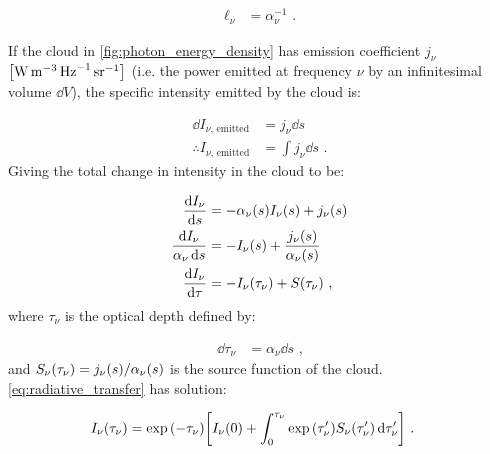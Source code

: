 \begin{equation}
	\begin{aligned}
		\ell_\nu &=\alpha_\nu^{-1}\text{ .}
	\end{aligned}
\end{equation}

\noindent If the cloud in \autoref{fig:photon_energy_density} has emission coefficient $j_\nu$
$\qty[\si{\watt\per\meter\cubed\per\hertz\per\steradian}]$ (i.e. the power emitted at frequency $\nu$ by an infinitesimal volume $\dd{V}$), the specific intensity emitted by the cloud is:

\begin{equation}
	\begin{aligned}
		\dd{I_{\nu\text{, emitted}}}&=j_\nu \dd{s} \\
		\therefore I_{\nu\text{, emitted}} &= \int j_\nu \dd{s} \text{ .}
	\end{aligned}\label{eq:emission_coefficient}
\end{equation}
\noindent Giving the total change in intensity in the cloud to be:

\begin{equation}
	\begin{aligned}
		\dv{I_\nu}{s}&=-\alpha_\nu\qty(s)I_\nu\qty(s)+j_\nu\qty(s) \\
		\frac{\dd{I_\nu}}{\alpha_\nu\dd{s}}&=-I_\nu\qty(s)+\frac{j_\nu\qty(s)}{\alpha_\nu\qty(s)} \\
		\dv{I_\nu}{\tau}&=-I_\nu\qty(\tau_\nu)+S\qty(\tau_\nu)\text{ ,}
	\end{aligned} \label{eq:radiative_transfer}
\end{equation}
\noindent where $\tau_\nu$ is the optical depth defined by:

\begin{equation}
	\begin{aligned}
		\dd{\tau_\nu}&=\alpha_\nu \dd{s}\text{ ,}
	\end{aligned}
\end{equation}
\noindent and $S_\nu\qty(\tau_\nu)=j_\nu\qty(s)/\alpha_\nu\qty(s)$ is the source function of the cloud. \autoref{eq:radiative_transfer} has solution:

\begin{equation}
	\begin{aligned}
		I_\nu\qty(\tau_\nu)&=\exp\qty(-\tau_\nu)\qty[I_\nu\qty(0)+\int_{0}^{\tau_\nu}\exp\qty(\tau'_\nu)S_\nu\qty(\tau'_\nu)\dd{\tau'_\nu}] \text{ .}
	\end{aligned} \label{eq:radiative_transfer_solution1}
\end{equation}

